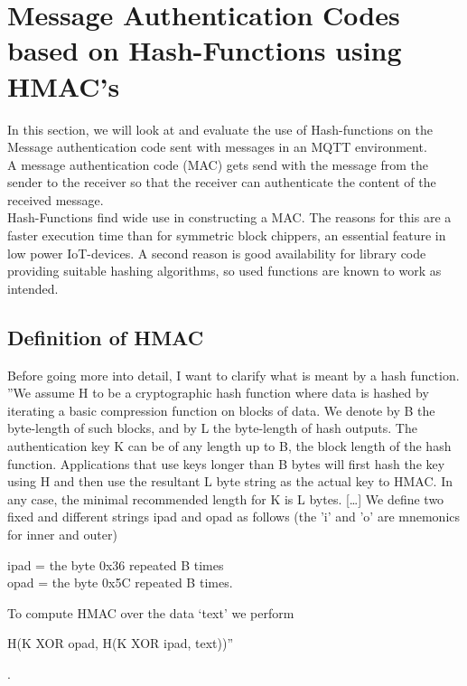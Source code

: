 \section{Message Authentication Codes based on Hash-Functions using HMAC's}

In this section, we will look at and evaluate the use of Hash-functions on the Message authentication code sent with messages in an MQTT environment. \\
A message authentication code (MAC) gets send with the message from the sender to the receiver so that the receiver can authenticate the content of the received message. \\
Hash-Functions find wide use in constructing a MAC. The reasons for this are a faster execution time than for symmetric block chippers, an essential feature in low power IoT-devices. A second reason is good availability for library code providing suitable hashing algorithms, so used functions are known to work as intended. 
\subsection{Definition of HMAC}
Before going more into detail, I want to clarify what is meant by a hash function. ''We assume H to be a cryptographic hash function where data is hashed by iterating a basic compression function on blocks of data. We denote by B the byte-length of such blocks, and by L the byte-length of hash outputs. The authentication key K can be of any length up to B, the block length of the hash function. Applications that use keys longer than B bytes will first hash the key using H and then use the resultant L byte string as the actual key to HMAC. In any case, the minimal recommended length for K is L bytes. [\dots] We define two fixed and different strings ipad and opad as follows (the ’i’ and ’o’ are mnemonics for inner and outer)
\begin{center}
ipad = the byte 0x36 repeated B times \\
opad = the byte 0x5C repeated B times.
\end{center}
To compute HMAC over the data ‘text’ we perform 
\begin{center}
H(K XOR opad, H(K XOR ipad, text))''
\end{center}
\cite{RFC}.  \\

